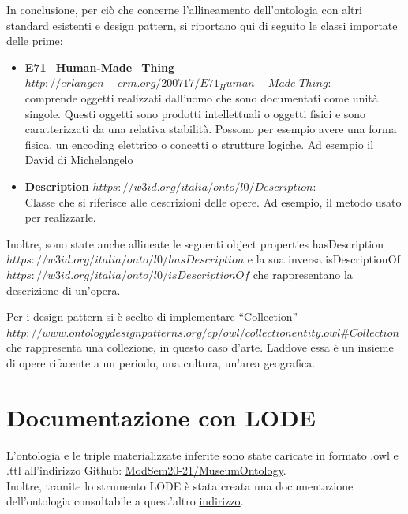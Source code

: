 \documentclass[12pt]{article}
\begin{document}
In conclusione, per ciò che concerne l’allineamento dell’ontologia con altri standard esistenti e design pattern, si riportano qui di seguito le classi importate delle prime:
\begin{itemize}
 \item \textbf{E71\_Human-Made\_Thing} $http://erlangen-crm.org/200717/E71_Human-Made\_Thing$:\\ comprende oggetti realizzati dall’uomo che sono documentati come unità singole. Questi oggetti sono prodotti intellettuali o oggetti fisici e sono caratterizzati da una relativa stabilità. Possono per esempio avere una forma fisica, un encoding elettrico o concetti o strutture logiche. Ad esempio il David di Michelangelo
 \item \textbf{Description} $https://w3id.org/italia/onto/l0/Description$:\\ Classe che si riferisce alle descrizioni delle opere. Ad esempio, il metodo usato per realizzarle.
\end{itemize} 
 
 Inoltre, sono state anche allineate le seguenti object properties hasDescription \\$https://w3id.org/italia/onto/l0/hasDescription$ e la sua inversa isDescriptionOf \\$https://w3id.org/italia/onto/l0/isDescriptionOf$ che rappresentano la descrizione di un’opera.

Per i design pattern si è scelto di implementare “Collection” \\$http://www.ontologydesignpatterns.org/cp/owl/collectionentity.owl\#Collection$ che rappresenta una collezione, in questo caso d'arte. Laddove essa è un insieme di opere rifacente a un periodo, una cultura, un'area geografica.
\newpage
\section{Documentazione con LODE}
L’ontologia e le triple materializzate inferite sono state caricate in formato .owl e .ttl all'indirizzo Github: \href{https://github.com/ModSem20-21/MuseumOntology/tree/master/Ontologia}{ModSem20-21/MuseumOntology}.\\
Inoltre, tramite lo strumento LODE è stata creata una documentazione dell’ontologia consultabile a quest'altro \href{https://github.com/ModSem20-21/MuseumOntology/tree/master/Documentazione%20LODE}{indirizzo}. 
\newpage
\end{document}
